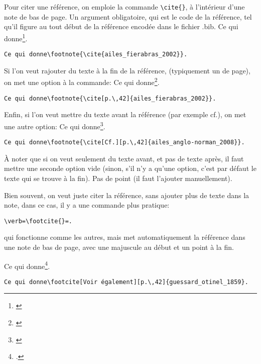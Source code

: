 \documentclass[a4paper,twoside,french,12pt]{book}
\begin{document}
Pour citer une référence, on emploie la commande \verb=\cite{}=, à l'intérieur d'une note de bas de page.
Un argument obligatoire, qui est le code de la référence, tel qu'il figure au tout début de la référence encodée dans le fichier .bib. Ce qui donne\footnote{\cite{ailes_fierabras_2002}}.

\begin{verbatim}
Ce qui donne\footnote{\cite{ailes_fierabras_2002}}.
\end{verbatim}

Si l'on veut rajouter du texte à la fin de la référence, (typiquement un \no de page), on met une option à la commande:
Ce qui donne\footnote{\cite[p.\,42]{ailes_fierabras_2002}}.
\begin{verbatim}
Ce qui donne\footnote{\cite[p.\,42]{ailes_fierabras_2002}}.
\end{verbatim}

Enfin, si l'on veut mettre du texte avant la référence (par exemple cf.), on met une autre option:
Ce qui donne\footnote{\cite[Cf.][p.\,42]{ailes_anglo-norman_2008}}.

\begin{verbatim}
Ce qui donne\footnote{\cite[Cf.][p.\,42]{ailes_anglo-norman_2008}}.
\end{verbatim}

À noter que si on veut seulement du texte avant, et pas de texte après, il faut mettre une seconde option vide (sinon, s'il n'y a qu'une option, c'est par défaut le texte qui se trouve à la fin). Pas de point (il faut l'ajouter manuellement).

Bien souvent, on veut juste citer la référence, sans ajouter plus de texte dans la note, dans ce cas, il y a une commande plus pratique:
\begin{verbatim}
\verb=\footcite{}=.
\end{verbatim}
qui fonctionne comme les autres, mais met automatiquement la référence dans une note de bas de page, avec une majuscule au début et un point à la fin.

Ce qui donne\footcite[Voir également][p.\,42]{guessard_otinel_1859}.
\begin{verbatim}
Ce qui donne\footcite[Voir également][p.\,42]{guessard_otinel_1859}.
\end{verbatim}

\end{document}
